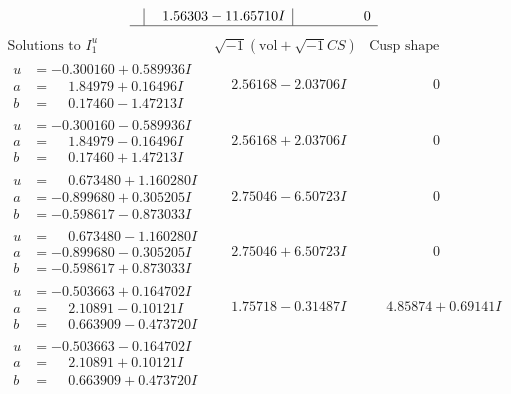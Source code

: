 \documentclass[1p]{elsarticle_modified}
\theoremstyle{definition}
\newcommand{\I}{\sqrt{-1}}
\begin{document}
$$\begin{array}{c|c|c}
 & \phantom{-}1.56303 - 11.65710 I & \phantom{-0.000000 } 0\\
 \hline 
 \end{array}$$\newpage$$\begin{array}{c|c|c}  
\text{Solutions to }I^u_{1}& \I (\text{vol} + \sqrt{-1}CS) & \text{Cusp shape}\\
 \hline 
\begin{aligned}
u &= -0.300160 + 0.589936 I \\
a &= \phantom{-}1.84979 + 0.16496 I \\
b &= \phantom{-}0.17460 - 1.47213 I\end{aligned}
 & \phantom{-}2.56168 - 2.03706 I & \phantom{-0.000000 } 0 \\ \hline\begin{aligned}
u &= -0.300160 - 0.589936 I \\
a &= \phantom{-}1.84979 - 0.16496 I \\
b &= \phantom{-}0.17460 + 1.47213 I\end{aligned}
 & \phantom{-}2.56168 + 2.03706 I & \phantom{-0.000000 } 0 \\ \hline\begin{aligned}
u &= \phantom{-}0.673480 + 1.160280 I \\
a &= -0.899680 + 0.305205 I \\
b &= -0.598617 - 0.873033 I\end{aligned}
 & \phantom{-}2.75046 - 6.50723 I & \phantom{-0.000000 } 0 \\ \hline\begin{aligned}
u &= \phantom{-}0.673480 - 1.160280 I \\
a &= -0.899680 - 0.305205 I \\
b &= -0.598617 + 0.873033 I\end{aligned}
 & \phantom{-}2.75046 + 6.50723 I & \phantom{-0.000000 } 0 \\ \hline\begin{aligned}
u &= -0.503663 + 0.164702 I \\
a &= \phantom{-}2.10891 - 0.10121 I \\
b &= \phantom{-}0.663909 - 0.473720 I\end{aligned}
 & \phantom{-}1.75718 - 0.31487 I & \phantom{-}4.85874 + 0.69141 I \\ \hline\begin{aligned}
u &= -0.503663 - 0.164702 I \\
a &= \phantom{-}2.10891 + 0.10121 I \\
b &= \phantom{-}0.663909 + 0.473720 I\end{aligned}

\end{array}$$
\end{document}
